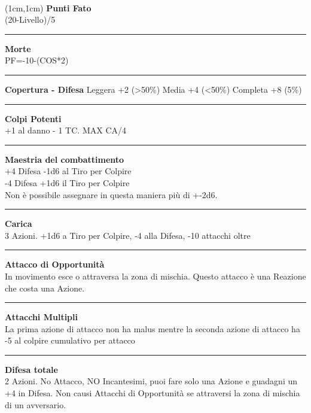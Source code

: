 \documentclass[a4paper,12 pt,openany]{book}
\newcommand{\riga}{\rule{\textwidth}{0.4pt}}
\begin{document}
~\newpage

\begin{textblock*}{4cm}(1cm,1cm) %
{\textbf{Punti Fato}\\
(20-Livello)/5}

\riga

{\textbf{Morte}\\
PF=-10-(COS*2)}

\riga

\textbf{Copertura - Difesa}
Leggera +2 (>50\%)
Media +4 (<50\%)
Completa +8 (5\%)

\riga

\textbf{Colpi Potenti}\\
+1 al danno - 1 TC. MAX CA/4

\riga

\textbf{Maestria del combattimento}\\
+4 Difesa -1d6 al Tiro per Colpire\\
-4 Difesa +1d6 il Tiro per Colpire \\
Non è possibile assegnare in questa maniera più di +-2d6.

\riga

\textbf{Carica}\\
3 Azioni. +1d6 a Tiro per Colpire, -4 alla Difesa, -10 attacchi oltre

\riga

\textbf{Attacco di Opportunità}\\
In movimento esce o attraversa la zona di mischia. Questo attacco è una Reazione che costa una Azione.

\riga

\textbf{Attacchi Multipli}\\
La prima azione di attacco non ha malus mentre la seconda azione di attacco ha -5 al colpire cumulativo per attacco

\riga

\textbf{Difesa totale}\\
2 Azioni. No Attacco, NO Incantesimi, puoi fare solo una Azione e guadagni un +4 in Difesa. Non causi Attacchi di Opportunità se attraversi la zona di mischia di un avversario.

\end{textblock*}
\end{document}
